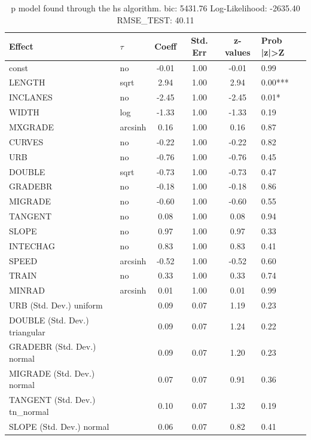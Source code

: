 \begin{table}
	\caption{p model found through the hs algorithm. bic: 5431.76 Log-Likelihood: -2635.40 RMSE_TEST: 40.11}
	\begin{center}
		\begin{tabular}{|l|l|c|c|c|l|}
			\hline
			Effect & $\tau$ & Coeff & Std. Err & z-values & Prob |z|>Z \\
			\hline
			const & no & -0.01 & 1.00 & -0.01 & 0.99 \\
			\hline
			LENGTH & sqrt & 2.94 & 1.00 & 2.94 & 0.00*** \\
			\hline
			INCLANES & no & -2.45 & 1.00 & -2.45 & 0.01* \\
			\hline
			WIDTH & log & -1.33 & 1.00 & -1.33 & 0.19 \\
			\hline
			MXGRADE & arcsinh & 0.16 & 1.00 & 0.16 & 0.87 \\
			\hline
			CURVES & no & -0.22 & 1.00 & -0.22 & 0.82 \\
			\hline
			URB & no & -0.76 & 1.00 & -0.76 & 0.45 \\
			\hline
			DOUBLE & sqrt & -0.73 & 1.00 & -0.73 & 0.47 \\
			\hline
			GRADEBR & no & -0.18 & 1.00 & -0.18 & 0.86 \\
			\hline
			MIGRADE & no & -0.60 & 1.00 & -0.60 & 0.55 \\
			\hline
			TANGENT & no & 0.08 & 1.00 & 0.08 & 0.94 \\
			\hline
			SLOPE & no & 0.97 & 1.00 & 0.97 & 0.33 \\
			\hline
			INTECHAG & no & 0.83 & 1.00 & 0.83 & 0.41 \\
			\hline
			SPEED & arcsinh & -0.52 & 1.00 & -0.52 & 0.60 \\
			\hline
			TRAIN & no & 0.33 & 1.00 & 0.33 & 0.74 \\
			\hline
			MINRAD & arcsinh & 0.01 & 1.00 & 0.01 & 0.99 \\
			\hline
			URB (Std. Dev.) uniform &  & 0.09 & 0.07 & 1.19 & 0.23 \\
			\hline
			DOUBLE (Std. Dev.) triangular &  & 0.09 & 0.07 & 1.24 & 0.22 \\
			\hline
			GRADEBR (Std. Dev.) normal &  & 0.09 & 0.07 & 1.20 & 0.23 \\
			\hline
			MIGRADE (Std. Dev.) normal &  & 0.07 & 0.07 & 0.91 & 0.36 \\
			\hline
			TANGENT (Std. Dev.) tn_normal &  & 0.10 & 0.07 & 1.32 & 0.19 \\
			\hline
			SLOPE (Std. Dev.) normal &  & 0.06 & 0.07 & 0.82 & 0.41 \\

\end{tabular}
\end{center}
\end{table}
